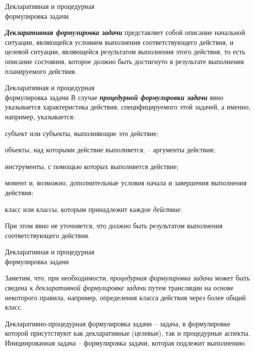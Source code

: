 \begin{frame}{Декларативная и процедурная\\ формулировка задачи}
	\topline
	\justifying
  
    \textbf{\textit{Декларативная формулировка задачи}} представляет собой описание начальной ситуации, являющейся условием выполнения соответствующего действия, и целевой ситуации, являющейся результатом выполнения этого действия, то есть  описание состояния, которое должно быть достигнуто в результате выполнения планируемого действия. 
\end{frame}

\begin{frame}{Декларативная и процедурная\\ формулировка задачи}
	\topline
	\justifying
     В случае \textbf{\textit{процедурной формулировки задачи}} явно указывается характеристика действия, специфицируемого этой задачей, а именно, например, указывается:
    \begin{textitemize}
    \item субъект или субъекты, выполняющие это действие;
    \item объекты, над которыми действие выполняется, -- аргументы действия;
    \item инструменты, с помощью которых выполняется действие;
    \item момент и, возможно, дополнительные условия начала и завершения выполнения действия;
    \item класс или классы, которым принадлежит каждое \textit{действие}.
    \end{textitemize}	
    
	При этом явно не уточняется, что должно быть результатом выполнения соответствующего действия. 
    
\end{frame}

\begin{frame}{Декларативная и процедурная\\ формулировка задачи}
	\topline
	\justifying
	\vspace{10mm}
	
    Заметим, что, при необходимости, \textit{процедурная формулировка задачи} может быть сведена к \textit{декларативной формулировке задачи} путем трансляции на основе некоторого правила, например, определения класса действия через более общий класс.
    
    \bigskip
    
    Декларативно-процедурная формулировка задачи -- задача, в формулировке которой присутствуют как декларативные (целевые), так и процедурные аспекты.  Инициированная задача -- формулировка задачи, которая подлежит выполнению.
    
\end{frame}

